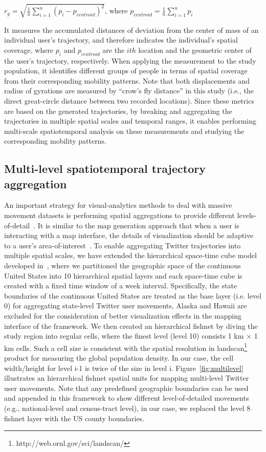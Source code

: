 \documentclass[ijgi,article,accept,moreauthors,pdftex,10pt,a4paper]{mdpi}
\theoremstyle{mdpi}
\newcounter{ex}
\newcounter{re}
\theoremstyle{mdpidefinition}
\begin{document}
$r_{g} = \sqrt{\frac{1}{n}\sum_{i=1}^{n}(p_{i} - p_{centroid})^{2}}$, where $p_{centroid} = \frac{1}{n}\sum_{i=1}^{n}p_{i}$
\newline

\noindent It measures the accumulated distances of deviation from the center of mass of an individual user's trajectory, and therefore indicates the individual's spatial coverage, where $p_{i}$ and $p_{centroid}$ are the $ith$ location and the geometric center of the user's trajectory, respectively.
When applying the measurement to the study population, it identifies different groups of people in terms of spatial coverage from their corresponding mobility patterns. Note that both displacements and radius of gyrations are measured by ``crow's fly distance'' in this study (i.e., the direct great-circle distance between two recorded locations).
Since these metrics are based on the generated trajectories, by breaking and aggregating the trajectories in multiple spatial scales and temporal ranges, it enables performing multi-scale spatiotemporal analysis on these measurements and studying the corresponding mobility patterns. 

\subsection{Multi-level spatiotemporal trajectory aggregation}
An important strategy for visual-analytics methods to deal with massive movement datasets is performing spatial aggregations to provide different levels-of-detail~\cite{andrienko2007designing,andrienko2007visual}.
It is similar to the map generation approach that when a user is interacting with a map interface, the details of visualization should be adaptive to a user's area-of-interest~\cite{buttenfield1991map}.
To enable aggregating Twitter trajectories into multiple spatial scales, we have extended the hierarchical space-time cube model developed in~\cite{cao2014scalable}, where we partitioned the geographic space of the continuous United States into 10 hierarchical spatial layers and each space-time cube is created with a fixed time window of a week interval. 
Specifically, the state boundaries of the continuous United States are treated as the base layer (i.e. level 0) for aggregating state-level Twitter user movements, Alaska and Hawaii are excluded for the consideration of better visualization effects in the mapping interface of the framework.
We then created an hierarchical fishnet by diving the study region into regular cells, where the finest level (level 10) consists 1 km $\times$ 1 km cells.
Such a cell size is consistent with the spatial resolution in landscan\footnote{http://web.ornl.gov/sci/landscan/} product for measuring the global population density.
In our case, the cell width/height for level i-1 is twice of the size in level i.
Figure~\ref{fig:multilevel} illustrates an hierarchical fishnet spatial units for mapping multi-level Twitter user movements.
Note that any predefined geographic boundaries can be used and appended in this framework to show different level-of-detailed movements (e.g., national-level and census-tract level), in our case, we replaced the level 8 fishnet layer with the US county boundaries.
\end{document}
